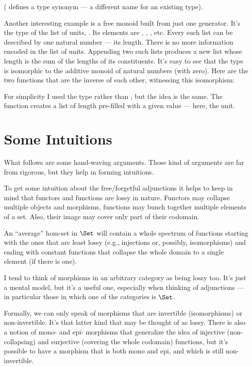 ( defines a type synonym --- a different name for an
existing type).

Another interesting example is a free monoid built from just one
generator. It's the type of the list of units, \code{{[}(){]}}. Its
elements are \code{{[}{]}}, \code{{[}(){]}}, \code{{[}(), (){]}},
etc. Every such list can be described by one natural number --- its
length. There is no more information encoded in the list of units.
Appending two such lists produces a new list whose length is the sum of
the lengths of its constituents. It's easy to see that the type
\code{{[}(){]}} is isomorphic to the additive monoid of natural
numbers (with zero). Here are the two functions that are the inverse of
each other, witnessing this isomorphism:

For simplicity I used the type  rather than
, but the idea is the same. The function
 creates a list of length  pre-filled with a
given value --- here, the unit.

\section{Some Intuitions}

What follows are some hand-waving arguments. Those kind of arguments are
far from rigorous, but they help in forming intuitions.

To get some intuition about the free/forgetful adjunctions it helps to
keep in mind that functors and functions are lossy in nature. Functors
may collapse multiple objects and morphisms, functions may bunch
together multiple elements of a set. Also, their image may cover only
part of their codomain.

An ``average'' hom-set in $\Set$ will contain a whole spectrum of
functions starting with the ones that are least lossy (e.g., injections
or, possibly, isomorphisms) and ending with constant functions that
collapse the whole domain to a single element (if there is one).

I tend to think of morphisms in an arbitrary category as being lossy
too. It's just a mental model, but it's a useful one, especially when
thinking of adjunctions --- in particular those in which one of the
categories is $\Set$.

Formally, we can only speak of morphisms that are invertible
(isomorphisms) or non-invertible. It's that latter kind that may be
thought of as lossy. There is also a notion of mono- and epi- morphisms
that generalize the idea of injective (non-collapsing) and surjective
(covering the whole codomain) functions, but it's possible to have a
morphism that is both mono and epi, and which is still non-invertible.

